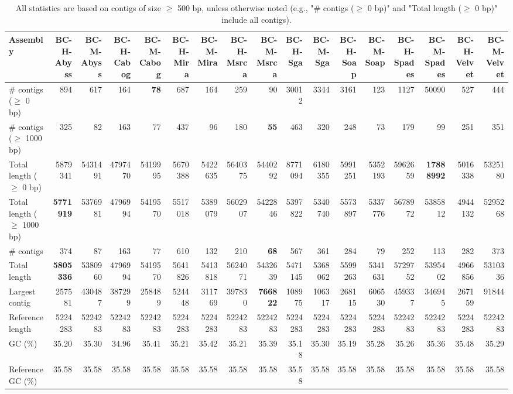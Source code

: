\documentclass[12pt,a4paper]{article}
\begin{document}
\begin{table}[ht]
\begin{center}
\caption{All statistics are based on contigs of size $\geq$ 500 bp, unless otherwise noted (e.g., "\# contigs ($\geq$ 0 bp)" and "Total length ($\geq$ 0 bp)" include all contigs).}
\begin{tabular}{|l*{16}{|r}|}
\hline
Assembly & BC-H-Abyss & BC-M-Abyss & BC-H-Cabog & BC-M-Cabog & BC-H-Mira & BC-M-Mira & BC-H-Msrca & BC-M-Msrca & BC-H-Sga & BC-M-Sga & BC-H-Soap & BC-M-Soap & BC-H-Spades & BC-M-Spades & BC-H-Velvet & BC-M-Velvet \\ \hline
\# contigs ($\geq$ 0 bp) & 894 & 617 & 164 & {\bf 78} & 687 & 164 & 259 & 90 & 30012 & 3344 & 3161 & 123 & 1127 & 50090 & 527 & 444 \\ \hline
\# contigs ($\geq$ 1000 bp) & 325 & 82 & 163 & 77 & 437 & 96 & 180 & {\bf 55} & 463 & 320 & 248 & 73 & 179 & 99 & 251 & 351 \\ \hline
Total length ($\geq$ 0 bp) & 5879341 & 5431491 & 4797470 & 5419995 & 5670388 & 5422635 & 5640375 & 5440292 & 8771094 & 6180355 & 5991251 & 5352193 & 5962659 & {\bf 17888992} & 5016338 & 5325180 \\ \hline
Total length ($\geq$ 1000 bp) & {\bf 5771919} & 5376981 & 4796994 & 5419570 & 5517018 & 5389079 & 5602907 & 5422846 & 5397822 & 5340740 & 5573897 & 5337776 & 5678972 & 5385812 & 4944132 & 5295268 \\ \hline
\# contigs & 374 & 87 & 163 & 77 & 610 & 132 & 210 & {\bf 68} & 567 & 361 & 284 & 79 & 252 & 113 & 282 & 373 \\ \hline
Total length & {\bf 5805336} & 5380960 & 4796994 & 5419570 & 5641826 & 5413818 & 5624071 & 5432639 & 5471145 & 5368062 & 5599263 & 5341631 & 5729752 & 5395402 & 4966856 & 5310336 \\ \hline
Largest contig & 257581 & 430487 & 387299 & 258489 & 524448 & 311769 & 397830 & {\bf 766822} & 108975 & 106317 & 268115 & 606530 & 459337 & 346945 & 267159 & 91844 \\ \hline
Reference length & 5224283 & 5224283 & 5224283 & 5224283 & 5224283 & 5224283 & 5224283 & 5224283 & 5224283 & 5224283 & 5224283 & 5224283 & 5224283 & 5224283 & 5224283 & 5224283 \\ \hline
GC (\%) & 35.20 & 35.30 & 34.96 & 35.41 & 35.21 & 35.42 & 35.21 & 35.39 & 35.18 & 35.30 & 35.19 & 35.28 & 35.26 & 35.36 & 35.48 & 35.29 \\ \hline
Reference GC (\%) & 35.58 & 35.58 & 35.58 & 35.58 & 35.58 & 35.58 & 35.58 & 35.58 & 35.58 & 35.58 & 35.58 & 35.58 & 35.58 & 35.58 & 35.58 & 35.58 \\ \hline

\end{tabular}
\end{center}
\end{table}
\end{document}

